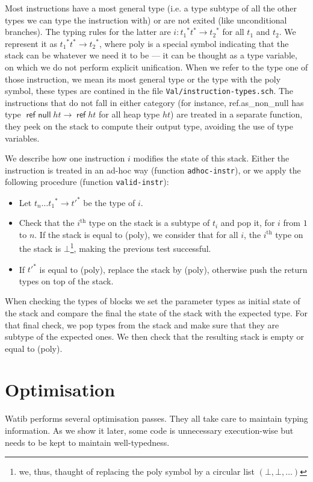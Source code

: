\documentclass[a4paper,11pt]{article}
\DeclareMathOperator{\reft}{\textsf{ref}}
\DeclareMathOperator{\refnullt}{\textsf{ref null}}
\begin{document}
Most instructions have a most general type (i.e. a type subtype of all the other
types we can type the instruction with) or are not exited (like unconditional
branches). The typing rules for the latter are $i:{t_1}^*t^*\to {t_2}^*$ for all
$t_1$ and $t_2$. We represent it as ${t_1}^*t^*\to {t_2}^*$, where \textsf{poly}
is a special symbol indicating that the stack can be whatever we need it to be
--- it can be thought as a type variable, on which we do not perform explicit
unification. When we refer to the type one of those instruction, we mean its
most general type or the type with the \textsf{poly} symbol, these types are
contined in the file \texttt{Val/instruction-types.sch}. The instructions that
do not fall in either category (for instance, \textsf{ref.as\_non\_null} has
type $\refnullt ht\to \reft ht$ for all heap type $ht$) are treated in a
separate function, they peek on the stack to compute their output type, avoiding
the use of type variables.

We describe how one instruction $i$ modifies the state of this stack. Either the
instruction is treated in an ad-hoc way (function \texttt{adhoc-instr}), or we
apply the following procedure (function \texttt{valid-instr}):

\begin{itemize}
\item Let ${t_n\ldots t_1}^*\to{t'}^*$ be the type of $i$.
\item Check that the $i^{\text{th}}$ type on the stack is a subtype of $t_i$ and
  pop it, for $i$ from $1$ to $n$. If the stack is equal to \textsf{(poly)}, we
  consider that for all $i$, the $i^{\text{th}}$ type on the stack is
  $\bot$\footnote{we, thus, thaught of replacing the \textsf{poly} symbol by a
  circular list $(\bot,\bot,\ldots)$}, making the previous test successful.
\item If ${t'}^*$ is equal to \textsf{(poly)}, replace the stack by
  \textsf{(poly)}, otherwise push the return types on top of the stack.
\end{itemize}

When checking the types of blocks we set the parameter types as initial state of
the stack and compare the final the state of the stack with the expected type.
For that final check, we pop types from the stack and make sure that they are
subtype of the expected ones. We then check that the resulting stack is empty or
equal to \textsf{(poly)}.

\section{Optimisation}\label{opt}
\textsf{Watib} performs several optimisation passes. They all take care to
maintain typing information. As we show it later, some code is unnecessary
execution-wise but needs to be kept to maintain well-typedness.
\end{document}
